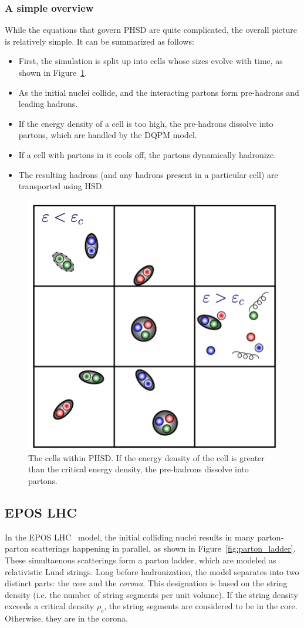 \subsubsection{A simple overview}
While the equations that govern PHSD are quite complicated, the overall picture is relatively simple. It can be summarized as follows:
\begin{itemize}
    \item First, the simulation is split up into cells whose sizes evolve with time, as shown in Figure~\ref{fig:phsd_cells}.
    \item As the initial nuclei collide, and the interacting partons form pre-hadrons and leading hadrons.
    \item If the energy density of a cell is too high, the pre-hadrons dissolve into partons, which are handled by the DQPM model.
    \item If a cell with partons in it cools off, the partons dynamically hadronize.
    \item The resulting hadrons (and any hadrons present in a particular cell) are transported using HSD.
\end{itemize}

\begin{figure}
    \centering
    \includegraphics[width=0.5\linewidth]{figures/introduction/phsd_cells.png}
    \caption{The cells within PHSD. If the energy density of the cell is greater than the critical energy density, the pre-hadrons dissolve into partons.}
    \label{fig:phsd_cells}
\end{figure}

\subsection{EPOS LHC}

In the EPOS LHC~\cite{EPOSLHC} model, the initial colliding nuclei results in many parton-parton scatterings happening in parallel, as shown in Figure~\ref{fig:parton_ladder}. These simultaenous scatterings form a parton ladder, which are modeled as relativistic Lund strings. Long before hadronization, the model separates into two distinct parts: the \textit{core} and the \textit{corona}. This designation is based on the string density (i.e. the number of string segments per unit volume). If the string density exceeds a critical density $\rho_c$, the string segments are considered to be in the core. Otherwise, they are in the corona. 


